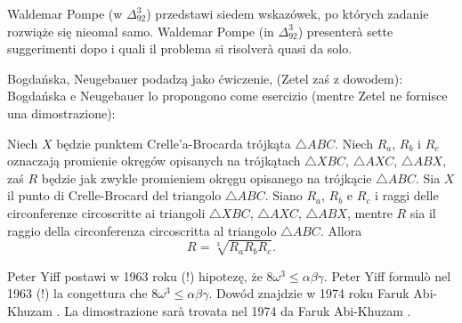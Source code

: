 Waldemar Pompe (w $\Delta_{92}^{3}$) przedstawi siedem wskazówek, po których zadanie rozwiąże się nieomal samo. %
Waldemar Pompe (in $\Delta_{92}^{3}$) presenterà sette suggerimenti dopo i quali il problema si risolverà quasi da solo. %

Bogdańska, Neugebauer \cite[s. 100]{neugebauer_2018} podadzą jako ćwiczenie, (Zetel \cite[s. 148]{zetel_2020} zaś z dowodem): %
Bogdańska e Neugebauer \cite[p. 100]{neugebauer_2018} lo propongono come esercizio (mentre Zetel \cite[p. 148]{zetel_2020} ne fornisce una dimostrazione): %

\begin{proposition}
    Niech $X$ będzie punktem Crelle'a-Brocarda trójkąta $\triangle ABC$. %
    Niech $R_a$, $R_b$ i $R_c$ oznaczają promienie okręgów opisanych na trójkątach $\triangle XBC$, $\triangle AXC$, $\triangle ABX$, zaś $R$ będzie jak zwykle promieniem okręgu opisanego na trójkącie $\triangle ABC$. %
    Sia $X$ il punto di Crelle-Brocard del triangolo $\triangle ABC$. %
    Siano $R_a$, $R_b$ e $R_c$ i raggi delle circonferenze circoscritte ai triangoli $\triangle XBC$, $\triangle AXC$, $\triangle ABX$, mentre $R$ sia il raggio della circonferenza circoscritta al triangolo $\triangle ABC$. %
    Allora %
    \begin{equation}
        R = \sqrt[3]{R_a R_b R_c}.
    \end{equation}
\end{proposition}

Peter Yiff \cite{yff_1963} postawi w 1963 roku (!) hipotezę, że $8 \omega^3 \le \alpha \beta \gamma$. %
Peter Yiff \cite{yff_1963} formulò nel 1963 (!) la congettura che $8 \omega^3 \le \alpha \beta \gamma$. %
%
Dowód znajdzie w 1974 roku Faruk Abi-Khuzam \cite{abikhuzam_1974}. %
La dimostrazione sarà trovata nel 1974 da Faruk Abi-Khuzam \cite{abikhuzam_1974}. %
%

